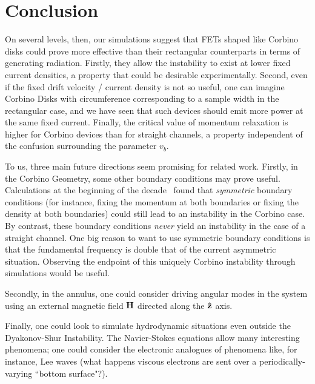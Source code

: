 \documentclass[12pt]{article}
\begin{document}
\section{Conclusion}
On several levels, then, our simulations suggest that FETs shaped like Corbino disks could prove more effective than their rectangular counterparts in terms of generating radiation.  Firstly, they allow the instability to exist at lower fixed current densities, a property that could be desirable experimentally.  Second, even if the fixed drift velocity / current density is not so useful, one can imagine Corbino Disks with circumference corresponding to a sample width in the rectangular case, and we have seen that such devices should emit more power at the same fixed current.  Finally, the critical value of momentum relaxation is higher for Corbino devices than for straight channels, a property independent of the confusion surrounding the parameter $v_b$.

To us, three main future directions seem promising for related work.  Firstly, in the Corbino Geometry, some other boundary conditions may prove useful.  Calculations at the beginning of the decade~\cite{Sydoruk2010} found that \textit{symmetric} boundary conditions (for instance, fixing the momentum at both boundaries or fixing the density at both boundaries) could still lead to an instability in the Corbino case.  By contrast, these boundary conditions \textit{never} yield an instability in the case of a straight channel.  One big reason to want to use symmetric boundary conditions is that the fundamental frequency is double that of the current asymmetric situation.  Observing the endpoint of this uniquely Corbino instability through simulations would be useful.

Secondly, in the annulus, one could consider driving angular modes in the system using an external magnetic field $\vb{H}$ directed along the $\vu{z}$ axis.

Finally, one could look to simulate hydrodynamic situations even outside the Dyakonov-Shur Instability.  The Navier-Stokes equations allow many interesting phenomena; one could consider the electronic analogues of phenomena like, for instance, Lee waves (what happens viscous electrons are sent over a periodically-varying ``bottom surface"?).
 



{}

\end{document}
